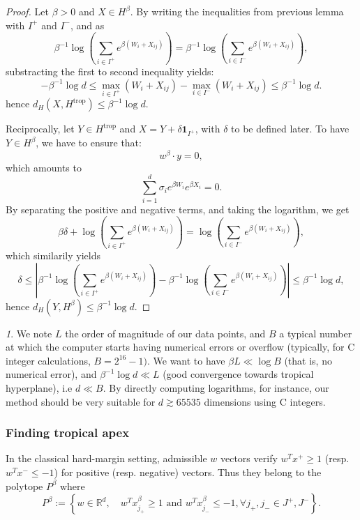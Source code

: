 \documentclass[oneside,english,a4paper]{amsart}
\numberwithin{equation}{section}
\numberwithin{figure}{section}
\theoremstyle{plain}
\theoremstyle{definition}
\theoremstyle{plain}
\theoremstyle{remark}
\newtheorem{rem}[thm]{\protect\remarkname}
\theoremstyle{plain}
\theoremstyle{definition}
\theoremstyle{definition}
\providecommand{\remarkname}{Remark}
\begin{document}
\begin{proof}
Let $\beta>0$ and $X\in H^{\beta}$. By writing the inequalities
from previous lemma with $I^{+}$ and $I^{-}$, and as $$\beta^{-1}\log\left(\sum_{i\in I^{+}}e^{\beta(W_{i}+X_{ij})}\right)=\beta^{-1}\log\left(\sum_{i\in I^{-}}e^{\beta(W_{i}+X_{ij})}\right),$$
substracting the first to second inequality yields: 
\[
-\beta^{-1}\log d\le\max_{i\in I^{+}}(W_{i}+X_{ij})-\max_{i\in I^{-}}(W_{i}+X_{ij})\le\beta^{-1}\log d.
\]
hence $d_H(X,H^{\text{trop}})\le\beta^{-1}\log d$.

Reciprocally, let $Y\in H^{\text{trop}}$ and $X=Y+\delta\mathbf{1}_{I^{+}}$,
with $\delta$ to be defined later. To have $Y\in H^{\beta}$, we
have to ensure that: 
\[
w^{\beta}\cdot y=0,
\]
which amounts to 
\[
\sum_{i=1}^d\sigma_{i}e^{\beta W_{i}}e^{\beta X_{i}}=0.
\]
By separating the positive and negative terms, and taking the logarithm,
we get 
\[
\beta\delta+\log\left(\sum_{i\in I^{+}}e^{\beta(W_{i}+X_{ij})}\right)=\log\left(\sum_{i\in I^{-}}e^{\beta(W_{i}+X_{ij})}\right),
\]
which similarily yields 
\[
\delta\le\left|\beta^{-1}\log\left(\sum_{i\in I^{+}}e^{\beta(W_{i}+X_{ij})}\right)-\beta^{-1}\log\left(\sum_{i\in I^{-}}e^{\beta(W_{i}+X_{ij})}\right)\right|\le\beta^{-1}\log d,
\]
hence $d_H(Y,H^{\beta})\le\beta^{-1}\log d$. 
\end{proof}
\begin{rem}
We note $L$ the order of magnitude of our data points, and $B$ a
typical number at which the computer starts having numerical errors
or overflow (typically, for C integer calculations, $B=2^{16}-1)$.
We want to have $\beta L\ll\log B$ (that is, no numerical error),
and $\beta^{-1}\log d\ll L$ (good convergence towards tropical hyperplane),
i.e $d\ll B$. By directly computing logarithms, for instance, our
method should be very suitable for $d\apprge65535$ dimensions using
C integers. 
\end{rem}


\subsubsection{Finding tropical apex}

In the classical hard-margin setting, admissible $w$ vectors verify
$w^{T}x^{+}\ge1$ (resp. $w^{T}x^{-}\le-1$) for positive (resp. negative)
vectors. Thus they belong to the polytope $P^{\beta}$ where 
\[
P^{\beta}:=\left\{ w\in\mathbb{R}^{d},\quad w^{T}x_{j_{+}}^{\beta}\ge1\text{ and }w^{T}x_{j_{-}}^{\beta}\le-1,\forall j_{+},j_{-}\in J^{+},J^{-}\right\} .
\]
\end{document}
